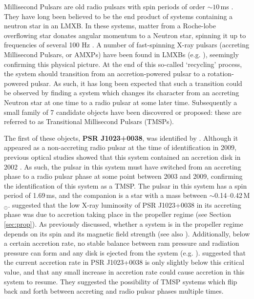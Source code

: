 \par Millisecond Pulsars are old radio pulsars with spin periods of order $\sim10$\,ms \citep{Backer_MSP}. They have long been believed to be the end product of systems containing a neutron star in an LMXB. In these systems, matter from a Roche-lobe overflowing star donates angular momentum to a Neutron star, spinning it up to frequencies of several 100 Hz \citep{Alpar_MSP}. A number of fast-spinning X-ray pulsars (accreting Millisecond Pulsars, or AMXPs) have been found in LMXBs (e.g. \citealp{Wijnands_XRPulsar,Altamirano_Broken,Patruno_AllAMXPs,Sanna_AMXP}), seemingly confirming this physical picture. At the end of this so-called `recycling' process, the system should transition from an accretion-powered pulsar to a rotation-powered pulsar. As such, it has long been expected that such a transition could be observed by finding a system which changes its character from an accreting Neutron star at one time to a radio pulsar at some later time. Subsequently a small family of 7 candidate objects have been discovered or proposed: these are referred to as Transitional Millisecond Pulsars (TMSPs).
\par The first of these objects, \textbf{PSR J1023+0038}, was identified by \citealp{Archibald_Link}. Although it appeared as a non-accreting radio pulsar at the time of identification in 2009, previous optical studies showed that this system contained an accretion disk in 2002 \citep{Szkody_1023Accretion}. As such, the pulsar in this system must have switched from an accreting phase to a radio pulsar phase at some point between 2003 and 2009, confirming the identification of this system as a TMSP. The pulsar in this system has a spin period of 1.69\,ms, and the companion is a star with a mass between $\sim$0.14--0.42\,M$_\odot$. \citealp{Archibald_Link} suggested that the low X-ray luminosity of PSR J1023+0038 in its accreting phase was due to accretion taking place in the propeller regime (see Section \ref{sec:prop}).  As previously discussed, whether a system is in the propeller regime depends on its spin and its magnetic field strength (see also \citealp{Lewin_QPORev}). Additionally, below a certain accretion rate, no stable balance between ram pressure and radiation pressure can form and any disk is ejected from the system (e.g. \citealp{Campana_NoDisk}). \citealp{Archibald_Link} suggested that the current accretion rate in PSR J1023+0038 is only slightly below this critical value, and that any small increase in accretion rate could cause accretion in this system to resume. They suggested the possibility of TMSP systems which flip back and forth between accreting and radio pulsar phases multiple times.
